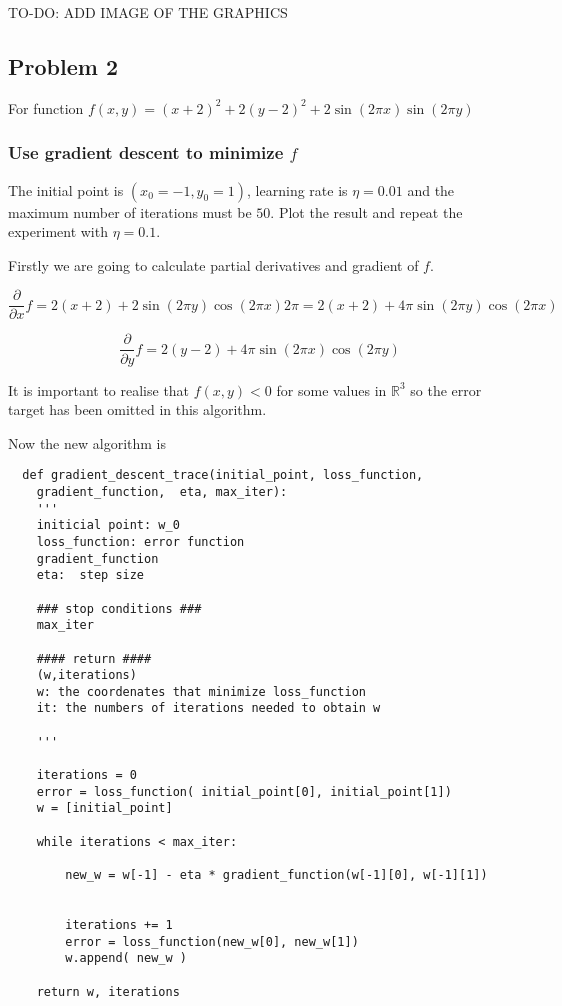 TO-DO: ADD IMAGE OF THE GRAPHICS 

\subsection{Problem 2}


For function $f(x,y) = (x+2)^2 + 2(y-2)^2 + 2 \sin (2 \pi x) \sin (2 \pi y)$

\subsubsection{ Use gradient descent to minimize $f$}

The initial point is $(x_0 = -1, y_0 = 1)$,
learning rate is $\eta = 0.01$ and the maximum number of iterations must
be $50$.  Plot the result and repeat the experiment with  $\eta = 0.1$. 

Firstly we are going to calculate partial derivatives and gradient of $f$.

\begin{equation*}
  \frac{\partial }{\partial x} f = 2 (x + 2) + 2 \sin (2 \pi y) \cos ( 2 \pi x) 2 \pi =  2 (x + 2) +  4 \pi \sin (2 \pi y) \cos ( 2 \pi x)   
\end{equation*}

\begin{equation*}
  \frac{\partial }{\partial y} f = 2 (y - 2) +  4 \pi \sin (2 \pi x) \cos ( 2 \pi y)   
\end{equation*}


It is important to realise that $f(x,y) <0$ for some values in $\mathbb R^3$ so the error target has been omitted in this algorithm.   


Now the new algorithm is
\begin{verbatim}
  def gradient_descent_trace(initial_point, loss_function,
    gradient_function,  eta, max_iter):
    '''
    initicial point: w_0 
    loss_function: error function 
    gradient_function
    eta:  step size 

    ### stop conditions ###
    max_iter

    #### return ####
    (w,iterations)
    w: the coordenates that minimize loss_function
    it: the numbers of iterations needed to obtain w
    
    '''

    iterations = 0
    error = loss_function( initial_point[0], initial_point[1])
    w = [initial_point]
  
    while iterations < max_iter: 

        new_w = w[-1] - eta * gradient_function(w[-1][0], w[-1][1])
        
        
        iterations += 1
        error = loss_function(new_w[0], new_w[1])
        w.append( new_w ) 
    
    return w, iterations
  
  \end{verbatim}


